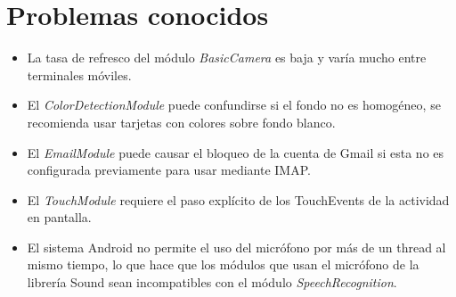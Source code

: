 \section{Problemas conocidos}
\begin{itemize}
	\item La tasa de refresco del módulo \textit{BasicCamera} es baja y varía mucho entre terminales móviles.
	\item El \textit{ColorDetectionModule} puede confundirse si el fondo no es homogéneo, se recomienda usar tarjetas con colores sobre fondo blanco.
	\item El \textit{EmailModule} puede causar el bloqueo de la cuenta de Gmail si esta no es configurada previamente para usar mediante IMAP.
	\item El \textit{TouchModule} requiere el paso explícito de los TouchEvents de la actividad en pantalla.
	\item El sistema Android no permite el uso del micrófono por más de un thread al mismo tiempo, lo que hace que los módulos que usan el micrófono de la librería Sound sean incompatibles con el módulo \textit{SpeechRecognition}.
\end{itemize}
\label{sec:known_issues}
    

